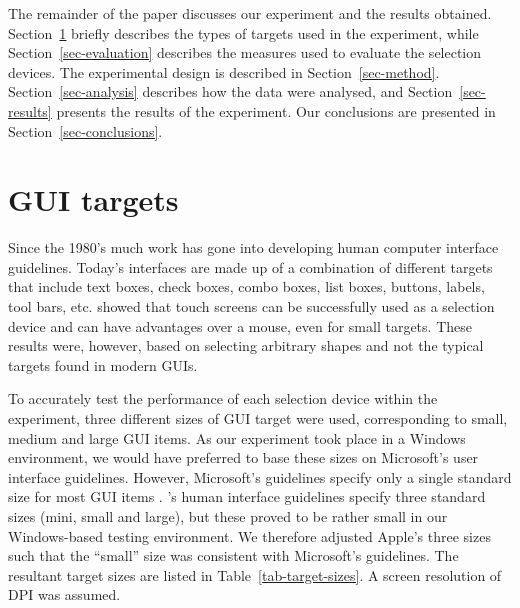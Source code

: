 \documentclass{elsart}
\begin{document}
The remainder of the paper discusses our experiment and the results
obtained. Section~\ref{sec-GUI} briefly describes the types of targets
used in the experiment, while Section~\ref{sec-evaluation} describes the
measures used to evaluate the selection devices. The experimental design
is described in Section~\ref{sec-method}. Section~\ref{sec-analysis}
describes how the data were analysed, and Section~\ref{sec-results}
presents the results of the experiment. Our conclusions are presented in
Section~\ref{sec-conclusions}.


\section{GUI targets}
\label{sec-GUI}

Since the 1980's much work has gone into developing human computer
interface guidelines. Today's interfaces are made up of a combination of
different targets that include text boxes, check boxes, combo boxes,
list boxes, buttons, labels, tool bars, etc. \citet{Sear-A-1991-IJMMS}
showed that touch screens can be successfully used as a selection device
and can have advantages over a mouse, even for small targets. These
results were, however, based on selecting arbitrary shapes and not the
typical targets found in modern GUIs.

To accurately test the performance of each selection device within the
experiment, three different sizes of GUI target were used, corresponding
to small, medium and large GUI items. As our experiment took place in a
Windows environment, we would have preferred to base these sizes on
Microsoft's user interface guidelines. However, Microsoft's guidelines
specify only a single standard size for most GUI items \citep[pp.\
448--450]{MS-1999-UI}. \citeauthor{Appl-2004-HIG}'s
\citeyearpar{Appl-2004-HIG} human interface guidelines specify three
standard sizes (mini, small and large), but these proved to be rather
small in our Windows-based testing environment. We therefore adjusted
Apple's three sizes such that the ``small'' size was consistent with
Microsoft's guidelines. The resultant target sizes are listed in
Table~\ref{tab-target-sizes}. A screen resolution of \unit[81]{DPI} was
assumed.
\end{document}
